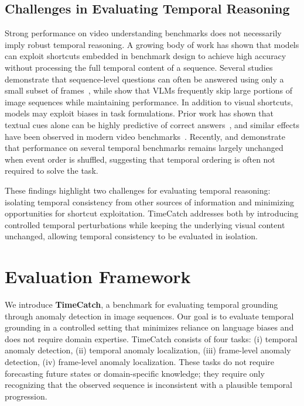 \documentclass[11pt]{article}
\begin{document}
\subsection{Challenges in Evaluating Temporal Reasoning}

Strong performance on video understanding benchmarks does not necessarily imply robust temporal reasoning. A growing body of work has shown that models can exploit shortcuts embedded in benchmark design to achieve high accuracy without processing the full temporal content of a sequence. Several studies demonstrate that sequence-level questions can often be answered using only a small subset of frames~\cite{buch2022revisiting,lei2023revealing}, while \citet{krojer2025shortcut} show that VLMs frequently skip large portions of image sequences while maintaining performance. In addition to visual shortcuts, models may exploit biases in task formulations. Prior work has shown that textual cues alone can be highly predictive of correct answers~\cite{goyal2017making}, and similar effects have been observed in modern video benchmarks~\cite{cores2025losttimenewtemporal}. Recently, \citet{xue2026seeing} and \citet{cores2025losttimenewtemporal} demonstrate that performance on several temporal benchmarks remains largely unchanged when event order is shuffled, suggesting that temporal ordering is often not required to solve the task. 

These findings highlight two challenges for evaluating temporal reasoning: isolating temporal consistency from other sources of information and minimizing opportunities for shortcut exploitation. TimeCatch addresses both by introducing controlled temporal perturbations while keeping the underlying visual content unchanged, allowing temporal consistency to be evaluated in isolation.



\section{Evaluation Framework}

We introduce \textbf{TimeCatch}, a benchmark for evaluating temporal grounding through anomaly detection in image sequences. Our goal is to evaluate temporal grounding in a controlled setting that minimizes reliance on language biases and does not require domain expertise. TimeCatch consists of four tasks:
(i) temporal anomaly detection,
(ii) temporal anomaly localization,
(iii) frame-level anomaly detection,
(iv) frame-level anomaly localization.
These tasks do not require forecasting future states or domain-specific knowledge; they require only recognizing that the observed sequence is inconsistent with a plausible temporal progression.
\end{document}

